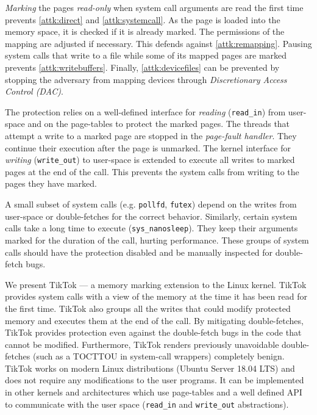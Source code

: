 \documentclass[conference]{IEEEtran}
\newcommand{\sysname}{TikTok}
\begin{document}
\emph{Marking} the pages \emph{read-only} when system call arguments are read
the first time prevents \autoref{attk:direct} and \autoref{attk:systemcall}. As
the page is loaded into the memory space, it is checked if it is already marked.
The permissions of the mapping are adjusted if necessary. This defends against
\autoref{attk:remapping}. Pausing system calls that write to a file while some
of its mapped pages are marked prevents \autoref{attk:writebuffers}. Finally,
\autoref{attk:devicefiles} can be prevented by stopping the adversary from
mapping devices through \emph{Discretionary Access Control (DAC)}.

The protection relies on a well-defined interface for \emph{reading} (\texttt{read\_in})
from user-space and on the page-tables to protect the marked pages. The
threads that attempt a write to a marked page are stopped in the
\emph{page-fault handler}. They continue their execution after the page is
unmarked. The kernel interface for \emph{writing} (\texttt{write\_out}) to
user-space is extended to execute all writes to marked pages at the end of the
call. This prevents the system calls from writing to the pages they have marked.

A small subset of system calls (e.g. \texttt{pollfd}, \texttt{futex}) depend on
the writes from user-space or double-fetches for the correct behavior.
Similarly, certain system calls take a long time to execute
(\texttt{sys\_nanosleep}). They keep their arguments marked for the duration of
the call, hurting performance. These groups of system calls should have the
protection disabled and be manually inspected for double-fetch bugs.


We present \sysname{} --- a memory marking extension to the Linux kernel.
\sysname{} provides system calls with a view of the memory at the time it has
been read for the first time. \sysname{} also groups all the writes that could
modify protected memory and executes them at the end of the call. By mitigating
double-fetches, \sysname{} provides protection even against the double-fetch
bugs in the code that cannot be modified. Furthermore, \sysname{} renders
previously unavoidable double-fetches (such as a TOCTTOU in system-call
wrappers) completely benign. \sysname{} works on modern Linux distributions
(Ubuntu Server 18.04 LTS) and does not require any modifications to the user
programs. It can be implemented in other kernels and architectures which use
page-tables and a well defined API to communicate with the user space
(\texttt{read\_in} and \texttt{write\_out} abstractions).
\end{document}
